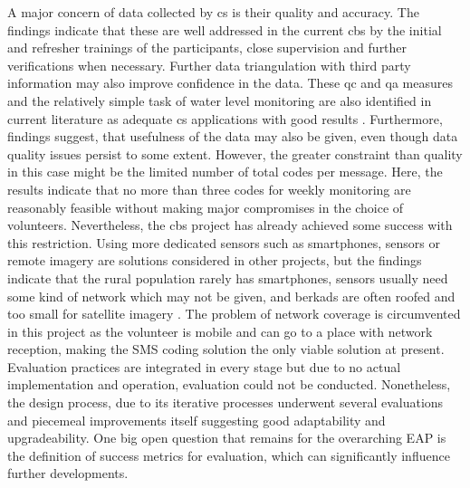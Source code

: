A major concern of data collected by \acrshort{cs} is their quality and accuracy. The findings indicate that these are well addressed in the current \acrshort{cbs} by the initial and refresher trainings of the participants, close supervision and further verifications when necessary. Further data triangulation with third party information may also improve confidence in the data. These \acrshort{qc} and \acrshort{qa} measures and the relatively simple task of water level monitoring are also identified in current literature as adequate \acrshort{cs} applications with good results \autocite{albusAccuracyLongtermVolunteer2020,baalbakiCitizenScienceLebanon2019,fraislCitizenScienceEnvironmental2022}. Furthermore, \autocite{aceves-buenoCitizenScienceApproach2015} findings suggest, that usefulness of the data may also be given, even though data quality issues persist to some extent. However, the greater constraint than quality in this case might be the limited number of total codes per message. Here, the results indicate that no more than three codes for weekly monitoring are reasonably feasible without making major compromises in the choice of volunteers. Nevertheless, the \acrshort{cbs} project has already achieved some success with this restriction.\newline
Using more dedicated sensors such as smartphones, sensors or remote imagery are solutions considered in other projects, but the findings indicate that the rural population rarely has smartphones, sensors usually need some kind of network which may not be given, and berkads are often roofed and too small for satellite imagery \autocite{bartramGlobalMonitoringWater2014,klemasUsingRemoteSensing2015,maoMovingTechnologySociotechnical2020,masindeITIKIMobileBased2019,mcneilLandscapeParticipatorySurveillance2022a,senayEstablishingOperationalWaterhole2013,thomsonRemoteMonitoringRural2021}. The problem of network coverage is circumvented in this project as the volunteer is mobile and can go to a place with network reception, making the SMS coding solution the only viable solution at present.\newline
Evaluation practices are integrated in every stage but due to no actual implementation and operation, evaluation could not be conducted. Nonetheless, the design process, due to its iterative processes underwent several evaluations and piecemeal improvements itself suggesting good adaptability and upgradeability. One big open question that remains for the overarching EAP is the definition of success metrics for evaluation, which can significantly influence further developments.\newline

